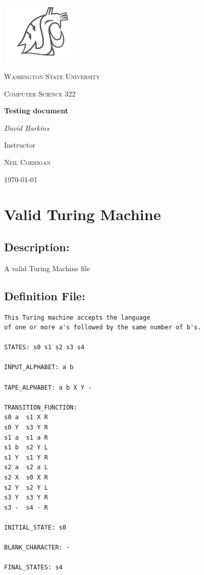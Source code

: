 \documentclass{report}
\begin{document}
 
 \begin{titlepage}
	\centering
    \includegraphics[width=4cm, height=3cm]{head-white-gray-big.png}

	{\scshape\LARGE Washington State University \par}
	\vspace{1cm}
	{\scshape\Large Computer Science 322\par}
	\vspace{1.5cm}
	{\huge\bfseries Testing document\par}
	\vspace{2cm}
	{\Large\itshape David Harkins\par}
	\vfill
	Instructor\par
	\textsc{Neil Corrigan}

	\vfill
	{\large \today\par}
\end{titlepage}
\pagebreak
 
\tableofcontents{}
\pagebreak




\chapter{Valid Turing Machine}
     
\section{Description:} A valid Turing Machine file

\section{Definition File: }
\begin{verbatim}
This Turing machine accepts the language 
of one or more a's followed by the same number of b's.

STATES: s0 s1 s2 s3 s4
	
INPUT_ALPHABET: a b

TAPE_ALPHABET: a b X Y -

TRANSITION_FUNCTION:
s0 a  s1 X R
s0 Y  s3 Y R
s1 a  s1 a R
s1 b  s2 Y L
s1 Y  s1 Y R
s2 a  s2 a L
s2 X  s0 X R
s2 Y  s2 Y L
s3 Y  s3 Y R
s3 -  s4 - R

INITIAL_STATE: s0

BLANK_CHARACTER: -

FINAL_STATES: s4
\end{verbatim}
\end{document}
